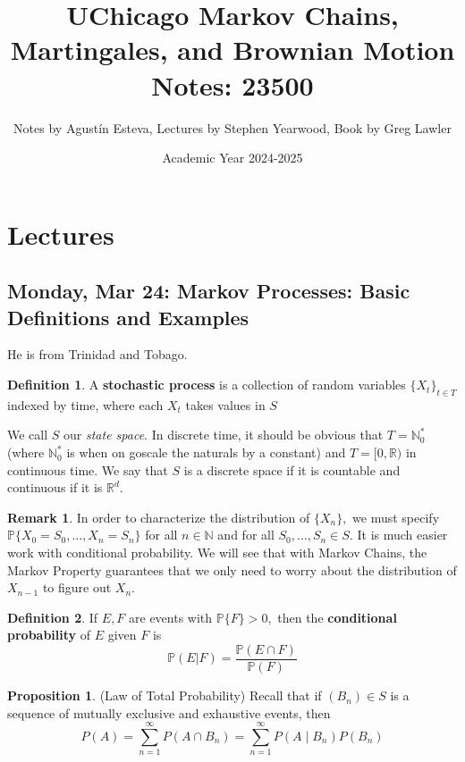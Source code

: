 \documentclass[10pt, oneside]{article}
\title{UChicago Markov Chains, Martingales, and Brownian Motion Notes: 23500}
\author{Notes by Agustín Esteva, Lectures by Stephen Yearwood, Book by Greg Lawler}
\date{Academic Year 2024-2025}
\newcommand{\bbR}{\mathbb{R}}
\newcommand{\bbN}{\mathbb{N}}
\theoremstyle{definition}
\newtheorem{defn}{Definition}
\newtheorem{prop}{Proposition}
\newtheorem{rem}{Remark}
\begin{document}
\maketitle
\tableofcontents

\vspace{.25in}


\newpage
\section{Lectures}

\subsection{Monday, Mar 24: Markov Processes: Basic Definitions and Examples}
He is from Trinidad and Tobago. 
\begin{defn}
    A \textbf{stochastic process}  is a collection of random variables $\{X_t\}_{t \in T}$ indexed by time, where each $X_t$ takes values in $S$
\end{defn}
We call $S$ our \textit{state space}. In discrete time, it should be obvious that $T = \bbN_0^*$ (where $\bbN_0^*$ is when on goscale the naturals by a constant) and $T = [0, \bbR)$ in continuous time. We say that $S$ is a discrete space if it is countable and continuous if it is $\bbR^d.$
\begin{rem}
    In order to characterize the distribution of $\{X_n\},$ we must specify $\mathbb{P}\{X_0 = S_0, \dots, X_n = S_n\}$ for all $n \in \bbN$ and for all $S_0, \dots, S_n \in S.$ It is much easier work with conditional probability. We will see that with Markov Chains, the Markov Property guarantees that we only need to worry about the distribution of $X_{n-1}$ to figure out $X_n.$
\end{rem}
\begin{defn}
    If $E,F$ are events with $\mathbb{P}\{F\} >0,$ then the \textbf{conditional probability} of $E$ given $F$ is 
    \[\mathbb{P}(E | F) = \frac{\mathbb{P}(E \cap F)}{\mathbb{P}(F)}\]
\end{defn}
\begin{prop}
    (Law of Total Probability) Recall that if $(B_n) \in S$ is a sequence of mutually exclusive and exhaustive events, then 
    \[P(A) = \sum_{n=1}^\infty P(A \cap B_n) = \sum_{n=1}^\infty P(A \mid B_n)P(B_n)\]
\end{prop}
\end{document}
